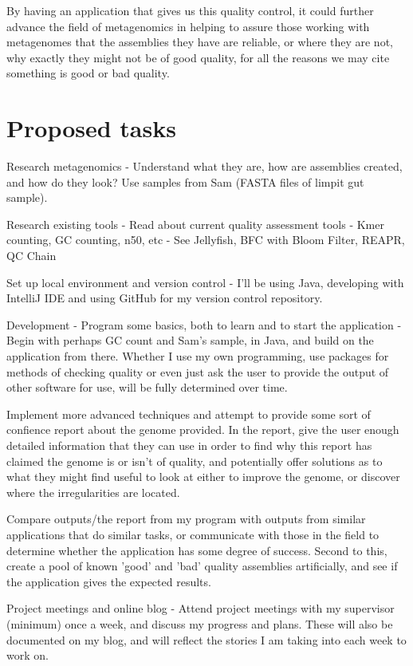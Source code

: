 \documentclass[11pt,fleqn,twoside]{article}
\begin{document}
By having an application that gives us this quality control, it could further advance the field of metagenomics in helping to assure those working with metagenomes that the assemblies they have are reliable, or where they are not, why exactly they might not be of good quality, for all the reasons we may cite something is good or bad quality.

\section{Proposed tasks}
Research metagenomics - Understand what they are, how are assemblies created, and how do they look? Use samples from Sam (FASTA files of limpit gut sample).

Research existing tools - Read about current quality assessment tools - Kmer counting, GC counting, n50, etc - See Jellyfish, BFC with Bloom Filter, REAPR, QC Chain

Set up local environment and version control - I'll be using Java, developing with IntelliJ IDE and using GitHub for my version control repository.

Development - Program some basics, both to learn and to start the application - Begin with perhaps GC count and Sam's sample, in Java, and build on the application from there. Whether I use my own programming, use packages for methods of checking quality or even just ask the user to provide the output of other software for use, will be fully determined over time.

Implement more advanced techniques and attempt to provide some sort of confience report about the genome provided. In the report, give the user enough detailed information that they can use in order to find why this report has claimed the genome is or isn't of quality, and potentially offer solutions as to what they might find useful to look at either to improve the genome, or discover where the irregularities are located.

Compare outputs/the report from my program with outputs from similar applications that do similar tasks, or communicate with those in the field to determine whether the application has some degree of success. Second to this, create a pool of known 'good' and 'bad' quality assemblies artificially, and see if the application gives the expected results.

Project meetings and online blog - Attend project meetings with my supervisor (minimum) once a week, and discuss my progress and plans. These will also be documented on my blog, and will reflect the stories I am taking into each week to work on.
\end{document}
